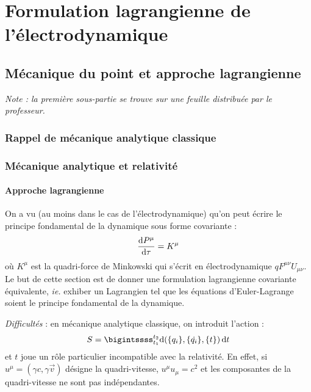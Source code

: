 \chapter{Formulation lagrangienne de l'électrodynamique}

\section{Mécanique du point et approche lagrangienne}
{\small \it Note : la première sous-partie se trouve sur une feuille distribuée par le professeur.}
\subsection{Rappel de mécanique analytique classique}
\subsection{Mécanique analytique et relativité}
\subsubsection{Approche lagrangienne}

On a vu (au moins dans le cas de l'électrodynamique) qu'on peut écrire le principe fondamental de la dynamique sous forme covariante :
$$
	\frac{\mathrm{d} P^\mu}{\mathrm{d} \tau}=K^\mu
$$
où $K^\mu$ est la quadri-force de Minkowski qui s'écrit en électrodynamique $qF^{\mu\nu}U_{\mu\nu}$. Le but de cette section est de donner une formulation lagrangienne covariante équivalente, \emph{ie.} exhiber un Lagrangien tel que les équations d'Euler-Lagrange soient le principe fondamental de la dynamique.

\emph{Difficultés }: en mécanique analytique classique, on introduit l'action :
$$
	S=\bigintssss_{t_1}^{t_2}\dif (\{q_i\},\{\dot{q_i}\},\{t\})\,\dif t
$$
et $t$ joue un rôle particulier incompatible avec la relativité. En effet, si $u^\mu=(\gamma c,\gamma \vec{v})$ désigne la quadri-vitesse, $u^\mu u_\mu = c^2$ et les composantes de la quadri-vitesse ne sont pas indépendantes.
	
